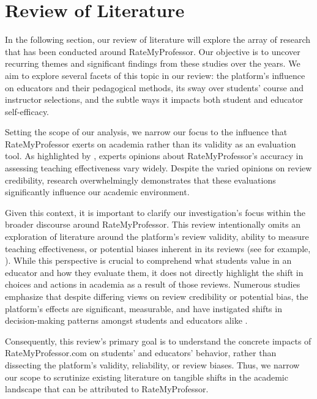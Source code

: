 \documentclass[man, 12pt]{apa7}
\begin{document}
\section{Review of Literature}
In the following section, our review of literature will explore the array of research that has been conducted around RateMyProfessor. Our objective is to uncover recurring themes and significant findings from these studies over the years. We aim to explore several facets of this topic in our review: the platform’s influence on educators and their pedagogical methods, its sway over students' course and instructor selections, and the subtle ways it impacts both student and educator self-efficacy.

Setting the scope of our analysis, we narrow our focus to the influence that RateMyProfessor exerts on academia rather than its validity as an evaluation tool. As highlighted by \textcite{rosen_correlations_2018}, experts opinions about RateMyProfessor’s accuracy in assessing teaching effectiveness vary widely. Despite the varied opinions on review credibility, research overwhelmingly demonstrates that these evaluations significantly influence our academic environment.

Given this context, it is important to clarify our investigation's focus within the broader discourse around RateMyProfessor. This review intentionally omits an exploration of literature around the platform's review validity, ability to measure teaching effectiveness, or potential biases inherent in its reviews (see for example, \textcite{reid_role_2010,hartman_what_2013, azab_analysing_2016, boring_gender_2017, rosen_correlations_2018, baker_quantcrit_2019, gordon_role_2021}). While this perspective is crucial to comprehend what students value in an educator and how they evaluate them, it does not directly highlight the shift in choices and actions in academia as a result of those reviews. Numerous studies emphasize that despite differing views on review credibility or potential bias, the platform's effects are significant, measurable, and have instigated shifts in decision-making patterns amongst students and educators alike \textcite{johnson_i_2014, boswell_ratemyprofessors_2016, boswell_effects_2020}.

Consequently, this review's primary goal is to understand the concrete impacts of RateMyProfessor.com on students' and educators' behavior, rather than dissecting the platform's validity, reliability, or review biases. Thus, we narrow our scope to scrutinize existing literature on tangible shifts in the academic landscape that can be attributed to RateMyProfessor.
\end{document}
